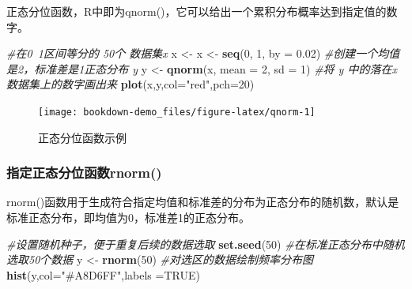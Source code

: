 \documentclass[
]{article}
\newenvironment{Shaded}{\begin{snugshade}}{\end{snugshade}}
\newcommand{\CommentTok}[1]{\textcolor[rgb]{0.56,0.35,0.01}{\textit{#1}}}
\newcommand{\DataTypeTok}[1]{\textcolor[rgb]{0.13,0.29,0.53}{#1}}
\newcommand{\DecValTok}[1]{\textcolor[rgb]{0.00,0.00,0.81}{#1}}
\newcommand{\FloatTok}[1]{\textcolor[rgb]{0.00,0.00,0.81}{#1}}
\newcommand{\KeywordTok}[1]{\textcolor[rgb]{0.13,0.29,0.53}{\textbf{#1}}}
\newcommand{\NormalTok}[1]{#1}
\newcommand{\OtherTok}[1]{\textcolor[rgb]{0.56,0.35,0.01}{#1}}
\newcommand{\StringTok}[1]{\textcolor[rgb]{0.31,0.60,0.02}{#1}}
\begin{document}
正态分位函数，R中即为qnorm()，它可以给出一个累积分布概率达到指定值的数字。

\begin{Shaded}
\begin{Highlighting}[]
\CommentTok{#在0~1区间等分的 50个 数据集x}
\NormalTok{x <-}\StringTok{ }\NormalTok{x <-}\StringTok{ }\KeywordTok{seq}\NormalTok{(}\DecValTok{0}\NormalTok{, }\DecValTok{1}\NormalTok{, }\DataTypeTok{by =} \FloatTok{0.02}\NormalTok{)}
\CommentTok{#创建一个均值是2，标准差是1正态分布 y}
\NormalTok{y <-}\StringTok{ }\KeywordTok{qnorm}\NormalTok{(x, }\DataTypeTok{mean =} \DecValTok{2}\NormalTok{, }\DataTypeTok{sd =} \DecValTok{1}\NormalTok{)}
\CommentTok{#将 y 中的落在x数据集上的数字画出来}
\KeywordTok{plot}\NormalTok{(x,y,}\DataTypeTok{col=}\StringTok{"red"}\NormalTok{,}\DataTypeTok{pch=}\DecValTok{20}\NormalTok{)}
\end{Highlighting}
\end{Shaded}

\begin{figure}

{\centering \texttt{[image: bookdown-demo\_files/figure-latex/qnorm-1]} 

}

\caption{正态分位函数示例}\label{fig:qnorm}
\end{figure}

\hypertarget{ux6307ux5b9aux6b63ux6001ux5206ux4f4dux51fdux6570rnorm}{%
\subsubsection{指定正态分位函数rnorm()}\label{ux6307ux5b9aux6b63ux6001ux5206ux4f4dux51fdux6570rnorm}}

rnorm()函数用于生成符合指定均值和标准差的分布为正态分布的随机数，默认是标准正态分布，即均值为0，标准差1的正态分布。

\begin{Shaded}
\begin{Highlighting}[]
\CommentTok{#设置随机种子，便于重复后续的数据选取}
\KeywordTok{set.seed}\NormalTok{(}\DecValTok{50}\NormalTok{)}
\CommentTok{#在标准正态分布中随机选取50个数据}
\NormalTok{y <-}\StringTok{ }\KeywordTok{rnorm}\NormalTok{(}\DecValTok{50}\NormalTok{)}
\CommentTok{#对选区的数据绘制频率分布图}
\KeywordTok{hist}\NormalTok{(y,}\DataTypeTok{col=}\StringTok{"#A8D6FF"}\NormalTok{,}\DataTypeTok{labels =}\OtherTok{TRUE}\NormalTok{)}
\end{Highlighting}
\end{Shaded}
\end{document}
